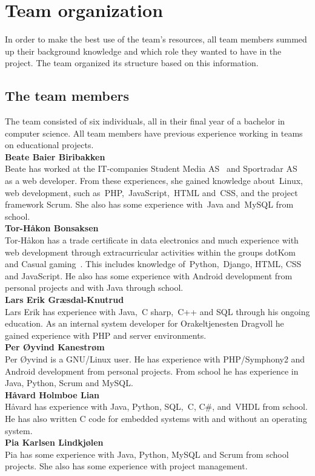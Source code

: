 
\section{Team organization}
In order to make the best use of the team's resources, all team members summed up their background knowledge and which role they wanted to have in the project. The team organized its structure based on this information.

\subsection{The team members}
The team consisted of six individuals, all in their final year of a bachelor in computer science. All team members have previous experience working in teams on educational projects.\\

\noindent\textbf{Beate Baier Biribakken}\\
Beate has worked at the IT-companies Student Media AS~\cite{studentmedia} and Sportradar AS~\cite{sportradar} as a web developer. From these experiences, she gained knowledge about~\gls{Linux}, web development, such as~\gls{PHP},~\gls{JavaScript},~\gls{HTML} and~\gls{CSS}, and the project framework Scrum. She also has some experience with~\gls{Java} and~\gls{MySQL} from school.\\

\noindent\textbf{Tor-Håkon Bonsaksen}\\
Tor-Håkon has a trade certificate in data electronics and much experience with web development through extracurricular activities within the groups dotKom~\cite{dotKom} and Casual gaming~\cite{casualgaming}. This includes knowledge of~\gls{Python},~\gls{Django}, HTML, CSS and JavaScript. He also has some experience with Android development from personal projects and with Java through school.\\

\noindent\textbf{Lars Erik Græsdal-Knutrud}\\
Lars Erik has experience with Java,~\gls{C sharp},~\gls{C++} and SQL through his ongoing education. As an internal system developer for Orakeltjenesten Dragvoll he gained experience with PHP and server environments. \\

\noindent\textbf{Per Øyvind Kanestrøm}\\
Per Øyvind is a GNU/Linux user. He has experience with PHP/Symphony2 and Android development from personal projects. From school he has experience in Java, Python, Scrum and MySQL.\\

\noindent\textbf{Håvard Holmboe Lian}\\
Håvard has experience with Java, Python, SQL,~\gls{C}, C\#, and~\gls{VHDL} from school. He has also written C code for embedded systems with and without an operating system.\\ 

\noindent\textbf{Pia	Karlsen	Lindkjølen}\\
Pia has some experience with Java, Python, MySQL and Scrum from school projects. She also has some experience with project management. 